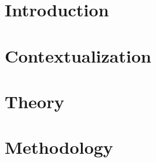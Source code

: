 \documentclass[12pt,twoside]{report}
\begin{document}

    



    {\hypersetup{linkcolor=black}
        \tableofcontents
        \listoffigures
        \listoftables
    }
        {\hypersetup{linkcolor=mycolor}}
    
    \chapter{Introduction} 
    

    \chapter{Contextualization} 
    
     
    \chapter{Theory}
    
    
    \chapter{Methodology}
    
    
    
    
\end{document}
